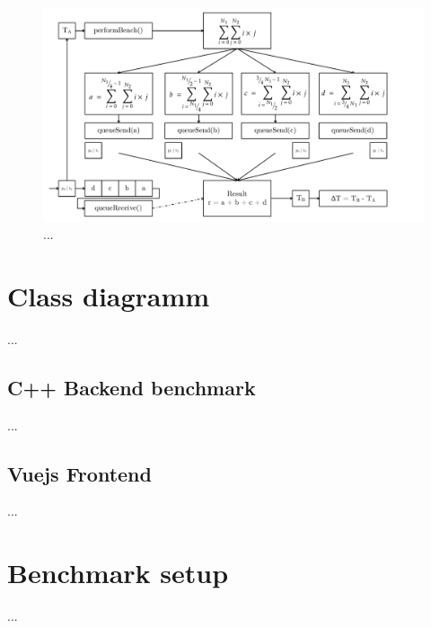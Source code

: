\begin{figure}[htbp]
	\centerline{\includegraphics[width=1.1\linewidth]{images/Split-Sum-Message-Passing.pdf}}
	\caption{ ...  }
	\label{fig:splitSumOverview}
\end{figure}

\newpage

\section{Class diagramm}

...

\subsection{C++ Backend benchmark}

...

\subsection{Vuejs Frontend}

...\newpage

\section{Benchmark setup}

...
